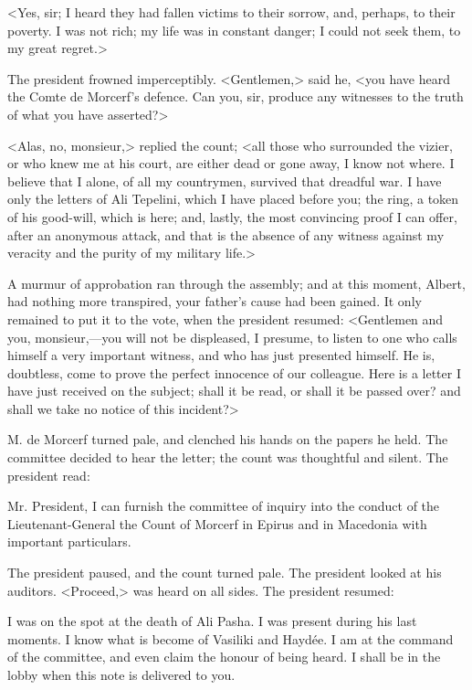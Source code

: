 <Yes, sir; I heard they had fallen victims to their sorrow, and, perhaps, to their poverty. I was not rich; my life was in constant danger; I could not seek them, to my great regret.> 

The president frowned imperceptibly. <Gentlemen,> said he, <you have heard the Comte de Morcerf's defence. Can you, sir, produce any witnesses to the truth of what you have asserted?>

<Alas, no, monsieur,> replied the count; <all those who surrounded the vizier, or who knew me at his court, are either dead or gone away, I know not where. I believe that I alone, of all my countrymen, survived that dreadful war. I have only the letters of Ali Tepelini, which I have placed before you; the ring, a token of his good-will, which is here; and, lastly, the most convincing proof I can offer, after an anonymous attack, and that is the absence of any witness against my veracity and the purity of my military life.> 

A murmur of approbation ran through the assembly; and at this moment, Albert, had nothing more transpired, your father's cause had been gained. It only remained to put it to the vote, when the president resumed: <Gentlemen and you, monsieur,—you will not be displeased, I presume, to listen to one who calls himself a very important witness, and who has just presented himself. He is, doubtless, come to prove the perfect innocence of our colleague. Here is a letter I have just received on the subject; shall it be read, or shall it be passed over? and shall we take no notice of this incident?> 

M. de Morcerf turned pale, and clenched his hands on the papers he held. The committee decided to hear the letter; the count was thoughtful and silent. The president read: 

\begin{mail}{}{Mr. President,}
I can furnish the committee of inquiry into the conduct of the Lieutenant-General the Count of Morcerf in Epirus and in Macedonia with important particulars.
\pausemail

The president paused, and the count turned pale. The president looked at his auditors. <Proceed,> was heard on all sides. The president resumed: 

\resumemail
I was on the spot at the death of Ali Pasha. I was present during his last moments. I know what is become of Vasiliki and Haydée. I am at the command of the committee, and even claim the honour of being heard. I shall be in the lobby when this note is delivered to you.
\end{mail}


